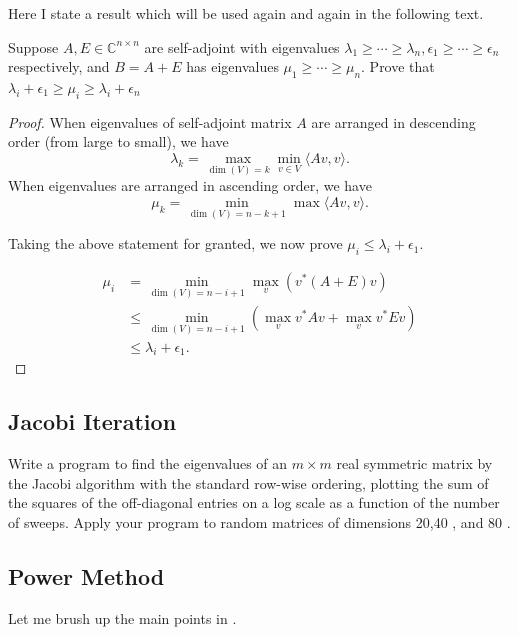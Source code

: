 \documentclass[dvipsnames, 12pt]{article}
\begin{document}
Here I state a result which will be used again and again in the following text.

\begin{problem}{}
     Suppose $A, E \in \mathbb{C}^{n \times n}$ are self-adjoint with eigenvalues $\lambda_1 \geq \cdots \geq \lambda_n, \epsilon_1 \geq \cdots \geq \epsilon_n$ respectively, and $B=A+E$ has eigenvalues $\mu_1 \geq \cdots \geq \mu_n$. Prove that $\lambda_i+\epsilon_1 \geq \mu_i \geq \lambda_i+\epsilon_n$
\end{problem}

\begin{proof}
    When eigenvalues of self-adjoint matrix $A$ are arranged in descending order (from large to small), we have
    $$
    \lambda_{k} = \max_{\operatorname{dim}(V) = k} \min_{v\in V} \langle Av, v\rangle.
    $$
    When eigenvalues are arranged in ascending order, we have
    $$
    \mu_{k} = \min_{\operatorname{dim}(V) = n-k+1} \max \langle Av, v\rangle.
    $$

    Taking the above statement for granted, we now prove $\mu_{i} \leq \lambda_{i} + \epsilon_{1}.$

    $$
    \begin{aligned}
        \mu_{i} & =\min_{\operatorname{dim}(V) = n-i+1} \max_{v} \left(v^{*}(A+E) v\right)\\
        & \leq \min_{\operatorname{dim}(V) = n-i+1} \left(\max_{v} v^{*}Av +\max_{v} v^{*}Ev\right)\\
        &\leq \lambda_{i} + \epsilon_{1}.
    \end{aligned}
    $$
\end{proof}
 


\subsection{Jacobi Iteration}

\begin{problem}{}
    Write a program to find the eigenvalues of an $m \times m$ real symmetric matrix by the Jacobi algorithm with the standard row-wise ordering, plotting the sum of the squares of the off-diagonal entries on a log scale as a function of the number of sweeps. Apply your program to random matrices of dimensions 20,40 , and 80 .
\end{problem}





\subsection{Power Method}
Let me brush up the main points in \cite{borm2012numerical}. 
\end{document}
